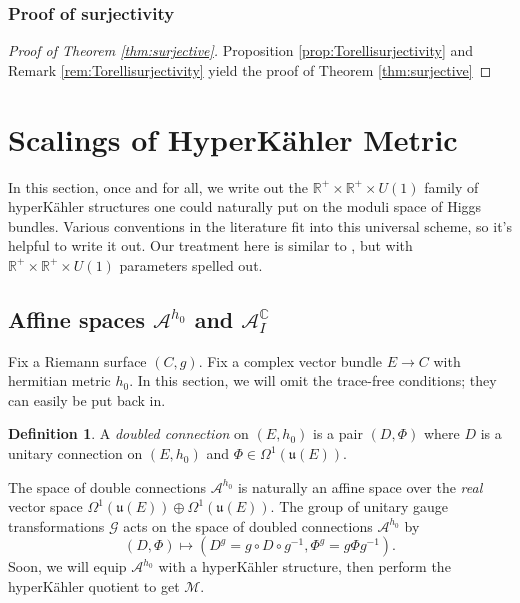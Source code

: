 \documentclass[12pt,letterpaper,reqno]{amsart}
\theoremstyle{remark}
\theoremstyle{definition}
\newtheorem{defn}[thm]{Definition}
\numberwithin{thm}{section}
\numberwithin{equation}{section}
\numberwithin{figure}{section}
\newcommand{\C}{\ensuremath{\mathbb C}}
\begin{document}
\subsubsection{Proof of surjectivity}


\begin{proof}[Proof of Theorem \ref{thm:surjective}]
Proposition \ref{prop:Torellisurjectivity} and Remark \ref{rem:Torellisurjectivity} yield the proof of Theorem \ref{thm:surjective}
\end{proof}


\appendix


\section{Scalings of \texorpdfstring{HyperK\"ahler}{HyperKahler} Metric}\label{sec:scalings}

In this section, once and for all,  we write out the $\mathbb{R}^+ \times \mathbb{R}^+ \times U(1)$ family of hyperK\"ahler structures one could naturally put on the moduli space of Higgs bundles. Various conventions in the literature fit into this universal scheme, so it's helpful to write it out. Our treatment here is similar to \cite{Neitzkecourse}, but with $\mathbb{R}^+ \times \mathbb{R}^+ \times U(1)$ parameters spelled out.


\subsection{Affine spaces \texorpdfstring{$\mathcal{A}^{h_0}$ and $\mathcal{A}_I^{\C}$}{}}
Fix a Riemann surface $(C, g)$. Fix a complex vector bundle $E \to C$ with hermitian metric $h_0$. In this section, we will omit the trace-free conditions; they can easily be put back in. 
\begin{defn}
A \emph{doubled connection} on $(E, h_0)$ is a pair $(D, \Phi)$ where $D$ is a unitary connection on $(E,h_0)$ and $\Phi \in \Omega^1( \mathfrak{u}(E))$.
\end{defn}

The space of double connections $\mathcal{A}^{h_0}$ is naturally an affine space over the \emph{real} vector space $\Omega^1(\mathfrak{u}(E)) \oplus \Omega^1(\mathfrak{u}(E))$.
The group of unitary gauge transformations $\mathcal{G}$ acts on the space of doubled connections $\mathcal{A}^{h_0}$ by
\[(D, \Phi) \mapsto (D^g= g \circ D \circ g^{-1}, \Phi^g = g \Phi g^{-1}). \]
Soon, we will equip $\mathcal{A}^{h_0}$ with a hyperK\"ahler structure, then perform the hyperK\"ahler quotient to get $\mathcal{M}$.
\end{document}
